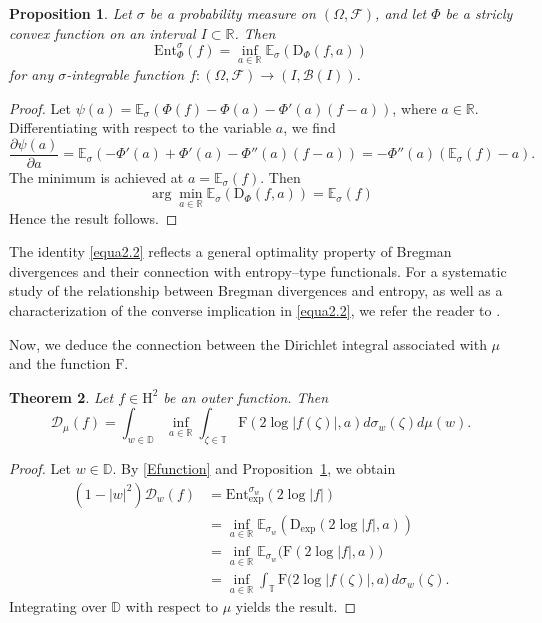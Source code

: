 \documentclass[12pt,reqno,a4paper]{amsart}
\newtheorem{prop}{Proposition}[section]
\newtheorem{theo}[prop]{Theorem}
\newcommand{\hH}{\mathrm{H^2 }}
\newcommand\TT{\mathbb{T}}
\newcommand\DD{\mathbb{D}}
\newcommand\RR{\mathbb{R}}
\newcommand{\FF}{\mathrm{F}}
\newcommand{\cD}{{\mathcal{D}}}
\numberwithin{equation}{section}
\begin{document}
\begin{prop}\label{Entropie}
	Let \( \sigma \) be a probability measure on \( (\Omega, \mathcal{F}) \), and let \( \Phi \) be a stricly convex function on an interval \( I \subset \mathbb{R} \). Then
	\[
	\mathrm{Ent}_\Phi^\sigma(f) = \inf_{a \in \mathbb{R}} \mathbb{E}_\sigma\left(\mathrm{D}_\Phi(f,a)\right)
	\]
	for any \( \sigma \)-integrable function \( f: (\Omega, \mathcal{F}) \to (I, \mathcal{B}(I)) \).
\end{prop}
\begin{proof}
	Let \(\psi(a) = \mathbb{E}_\sigma(\Phi(f) - \Phi(a) - \Phi'(a)(f - a))\), where \(a \in \mathbb{R}\). Differentiating with respect to the variable \(a\), we find
	\[
	\frac{\partial \psi(a)}{\partial a} = \mathbb{E}_\sigma(-\Phi'(a) + \Phi'(a) - \Phi''(a)(f - a)) = -\Phi''(a)(\mathbb{E}_\sigma(f) - a).
	\]
	The minimum is achieved at \(a = \mathbb{E}_\sigma(f)\). Then \begin{equation}\label{equa2.2}
		\arg \min_{a\in\RR} \mathbb{E}_\sigma(\mathrm{D}_\Phi(f,a))=\mathbb{E}_\sigma(f)
	\end{equation} Hence the result follows.
\end{proof}
The identity \eqref{equa2.2} reflects a general optimality property of Bregman divergences and their connection with entropy--type functionals. For a systematic study of the relationship between Bregman divergences and entropy, as well as a characterization of the converse implication in \eqref{equa2.2}, we refer the reader to \cite{Banerjee2005}.

Now, we deduce the connection between the Dirichlet integral associated with \( \mu \) and the function \( \FF \).
\begin{theo}\label{Function}
	Let \( f \in \hH \) be an outer function. Then
	\[
	\cD_\mu(f) = \int_{w\in\DD}\inf_{a \in \mathbb{R}} \int_{\zeta \in \TT} \FF(2\log|f(\zeta)|, a) d\sigma_w(\zeta)d\mu(w).
	\]
\end{theo}
\begin{proof}
	Let \( w \in \mathbb{D} \). By \eqref{Efunction} and Proposition~\ref{Entropie}, we obtain
	\[
	\begin{aligned}
		(1 - |w|^2)\mathcal{D}_w(f)
		&= \mathrm{Ent}_{\exp}^{\sigma_w}(2 \log |f|) \\
		&= \inf_{a \in \mathbb{R}} \mathbb{E}_{\sigma_w}\!\left(\mathrm{D}_{\exp}(2\log|f|,a)\right) \\
		&= \inf_{a \in \mathbb{R}} \mathbb{E}_{\sigma_w}\!\big(\FF(2\log |f|, a)\big) \\
		&= \inf_{a \in \mathbb{R}} \int_{\mathbb{T}} \FF\big(2 \log |f(\zeta)|, a\big)\, d\sigma_w(\zeta).
	\end{aligned}
	\]
	Integrating over \( \mathbb{D} \) with respect to \( \mu \) yields the result.
\end{proof}
\end{document}
